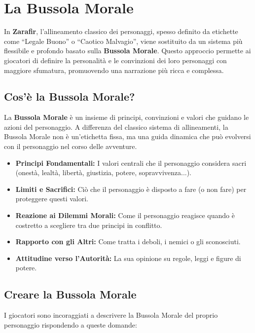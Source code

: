 \documentclass[../manuale_main.tex]{subfiles}
\begin{document}
\section{La Bussola Morale}

In \textbf{Zarafir}, l’allineamento classico dei personaggi, spesso definito da etichette come “Legale Buono” o “Caotico Malvagio”, viene sostituito da un sistema più flessibile e profondo basato sulla \textbf{Bussola Morale}. Questo approccio permette ai giocatori di definire la personalità e le convinzioni dei loro personaggi con maggiore sfumatura, promuovendo una narrazione più ricca e complessa.

\vspace{0.3cm}

\subsection{Cos'è la Bussola Morale?}
La \textbf{Bussola Morale} è un insieme di principi, convinzioni e valori che guidano le azioni del personaggio. A differenza del classico sistema di allineamenti, la Bussola Morale non è un’etichetta fissa, ma una guida dinamica che può evolversi con il personaggio nel corso delle avventure.

\begin{itemize}
    \item \textbf{Principi Fondamentali:} I valori centrali che il personaggio considera sacri (onestà, lealtà, libertà, giustizia, potere, sopravvivenza...).
    \item \textbf{Limiti e Sacrifici:} Ciò che il personaggio è disposto a fare (o non fare) per proteggere questi valori.
    \item \textbf{Reazione ai Dilemmi Morali:} Come il personaggio reagisce quando è costretto a scegliere tra due principi in conflitto.
    \item \textbf{Rapporto con gli Altri:} Come tratta i deboli, i nemici o gli sconosciuti.
    \item \textbf{Attitudine verso l'Autorità:} La sua opinione su regole, leggi e figure di potere.
\end{itemize}

\vspace{0.3cm}

\subsection{Creare la Bussola Morale}
I giocatori sono incoraggiati a descrivere la Bussola Morale del proprio personaggio rispondendo a queste domande:
\end{document}
